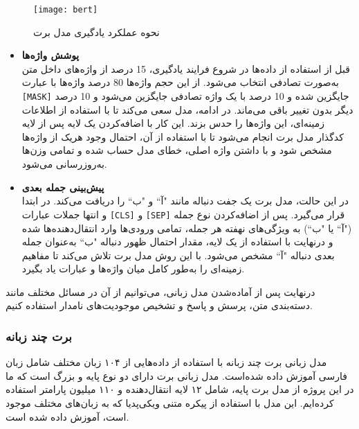 \begin{figure}[!h]
\texttt{[image: bert]}
\centering
\caption{ نحوه عملکرد یادگیری مدل برت \citep{devlin2018bert}}
\label{fig.BERT}
\end{figure}

\begin{itemize}
\item \textbf{پوشش واژه‌ها} \\
قبل از استفاده از داده‌ها در شروع فرایند یادگیری، 15 درصد از واژه‌های داخل متن به‌صورت تصادفی انتخاب می‌شود. 
 از این حجم واژه‌ها 80‌ درصد واژه‌ها با عبارت \verb|[MASK]| جایگزین شده و 10 درصد با یک واژه تصادفی جایگزین می‌شود و 10
 درصد دیگر بدون تغییر باقی می‌ماند. در ادامه، مدل سعی می‌کند تا با استفاده از اطلاعات زمینه‌ای، این واژه‌ها را حدس بزند.
 این کار با اضافه‌کردن یک لایه پس از لایه کدگذار مدل برت انجام می‌شود تا با استفاده از آن، احتمال وجود هریک از واژه‌ها
 مشخص شود و با داشتن واژه اصلی، خطای مدل حساب شده و تمامی وزن‌ها به‌روزرسانی می‌شود.

\item \textbf{پیش‌بینی جمله بعدی} \\
در این حالت، مدل برت یک جفت دنباله مانند "آ`` و "ب`` را دریافت می‌کند. در ابتدا و انتها جملات عبارات \verb|[CLS]| و \verb|[SEP]| قرار
 می‌گیرد. پس از اضافه‌کردن نوع جمله ("آ`` یا "ب``) به ویژگی‌های نهفته هر جمله، تمامی ورودی‌ها وارد انتقال‌دهنده‌ها شده و درنهایت با استفاده از یک لایه، مقدار احتمال ظهور دنباله "ب`` به‌عنوان جمله بعدی دنباله "آ`` مشخص می‌شود. با این روش مدل برت تلاش می‌کند تا مفاهیم زمینه‌ای را به‌طور کامل میان واژه‌ها و عبارات یاد بگیرد.
\end{itemize}

درنهایت پس از آماده‌شدن مدل زبانی، می‌توانیم از آن در مسائل مختلف مانند دسته‌بندی متن، پرسش و پاسخ و تشخیص
 موجودیت‌های نامدار استفاده کنیم.


\subsubsection{برت چند زبانه}
	مدل زبانی برت چند زبانه \citep{devlin2018bert} با استفاده از داده‌هایی از ۱۰۴ زبان مختلف شامل زبان فارسی آموزش داده شده‌است. مدل زبانی برت دارای دو نوع پایه و بزرگ است که ما در این پروژه از مدل برت پایه، شامل ۱۲ لایه انتقال‌دهنده و ۱۱۰ میلیون پارامتر استفاده کرده‌ایم. این مدل با استفاده از پیکره متنی ویکی‌پدیا که به زبان‌های مختلف موجود است، آموزش داده شده ‌است. 
	
